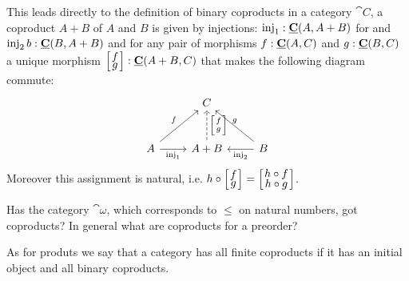 This leads directly to the definition of binary coproducts in a category $\cat{C}$, a coproduct $A+B$ of $A$ and $B$ is given by injections:
$\mathrm{inj}_1 : \underline{\mathbf{C}}(A,A+B)$ for and $\mathrm{inj}_2\,b : \underline{\mathbf{C}}(B,A+B)$ and for any pair of morphisms $f : \underline{\mathbf{C}}(A,C)$ and 
$g : \underline{\mathbf{C}}(B,C)$ a unique morphism $\case{f}{g} : \homC{C}{A+B}{C}$ that makes the following diagram commute:
\[\begin{tikzcd}[row sep=large]
& C \\
A \arrow[r,"\inj_1" below] \arrow[ur,"f"] & A + B \arrow[u,dashrightarrow,"\case{f}{g}" right] & B \arrow[l,"\inj_2"] \arrow[ul,"g" above]
\end{tikzcd}\]
Moreover this assignment is natural, i.e. $h \circ \case{f}{g} = \case{h\circ f}{h\circ g}$.

\begin{question}
  Has the category $\cat{\omega}$, which corresponds to $\leq$ on natural numbers, got coproducts? In general what are coproducts for a preorder?
\end{question}

As for produts we say that a category has all finite coproducts if it has an initial object and all binary coproducts.

